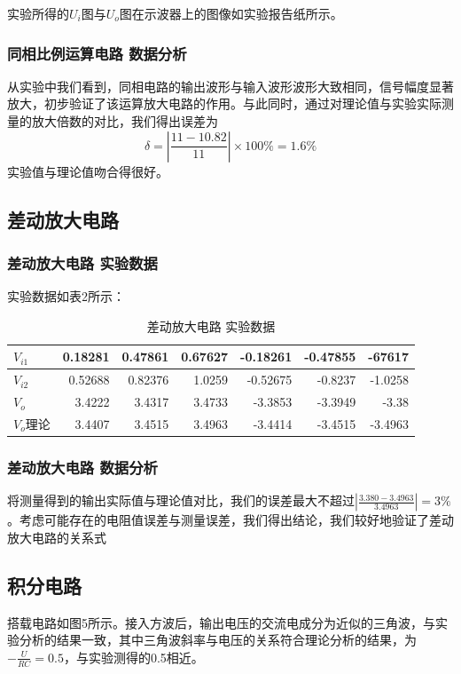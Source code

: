 \documentclass[UTF8]{article}
\begin{document}
实验所得的$U_i$图与$U_o$图在示波器上的图像如实验报告纸所示。

\subsubsection{同相比例运算电路 数据分析}
从实验中我们看到，同相电路的输出波形与输入波形波形大致相同，信号幅度显著放大，初步验证了该运算放大电路的作用。与此同时，通过对理论值与实验实际测量的放大倍数的对比，我们得出误差为
$$\delta = |\frac{11-10.82}{11}|\times 100\% = 1.6\% $$
实验值与理论值吻合得很好。

\subsection{差动放大电路}
\subsubsection{差动放大电路 实验数据}
实验数据如表2所示：
\begin{table}[htbp]
	\centering
	\caption{差动放大电路 实验数据}
	\begin{tabular}{|l|r|r|r|r|r|r|}
		\toprule
		$V_{i1}$ & 0.18281 & 0.47861 & 0.67627 & -0.18261 & -0.47855 & -67617 \\
		\midrule
		$V_{i2}$ & 0.52688 & 0.82376 & 1.0259 & -0.52675 & -0.8237 & -1.0258 \\
		\midrule
		$V_{o}$ & 3.4222 & 3.4317 & 3.4733 & -3.3853 & -3.3949 & -3.38 \\
		\midrule
		$V_{o}理论$ & 3.4407 & 3.4515 & 3.4963 & -3.4414 & -3.4515 & -3.4963 \\
		\bottomrule
	\end{tabular}%
	\label{tab5}%
\end{table}%

\subsubsection{差动放大电路 数据分析}
将测量得到的输出实际值与理论值对比，我们的误差最大不超过$|\frac{3.380-3.4963}{3.4963}| = 3\% $。考虑可能存在的电阻值误差与测量误差，我们得出结论，我们较好地验证了差动放大电路的关系式

\subsection{积分电路}
搭载电路如图5所示。接入方波后，输出电压的交流电成分为近似的三角波，与实验分析的结果一致，其中三角波斜率与电压的关系符合理论分析的结果，为$-\frac{U}{RC} = 0.5$，与实验测得的0.5相近。
\end{document}
